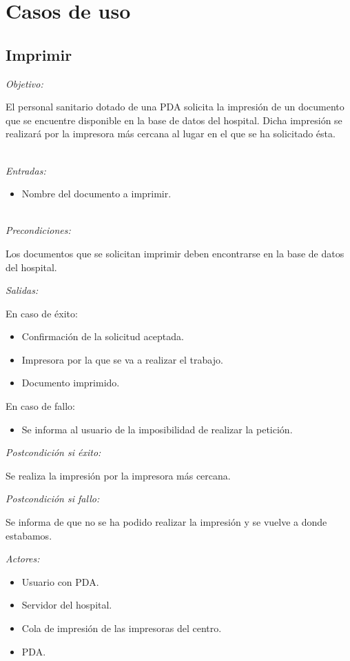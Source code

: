 \documentclass[12pt,a4paper,notitlepage,twoside]{report}
\begin{document}
\section{Casos de uso}
\subsection{Imprimir}
\emph{Objetivo:}
\begin{description}
El personal sanitario dotado de una PDA solicita la impresi\'on de un documento que se encuentre disponible en la base de datos del hospital. Dicha impresi\'on se realizará por la impresora m\'as cercana al lugar en el que se ha solicitado \'esta.
\end{description}
\\
\emph{Entradas:} 
\begin{itemize}
\item Nombre del documento a imprimir.
\end{itemize}
\\
\emph{Precondiciones:}
\begin{description}
Los documentos que se solicitan imprimir deben encontrarse en la base de datos del hospital.
\end{description}
\emph{Salidas:}
\begin{description}
\item En caso de \'exito: 
\begin{itemize}
\item Confirmaci\'on de la solicitud aceptada.
\item Impresora por la que se va a realizar el trabajo.
\item Documento imprimido.
\end{itemize}
\item En caso de fallo: 
\begin{itemize}
\item Se informa al usuario de la imposibilidad de realizar la petici\'on.
\end{itemize}
\end{description}
\emph{Postcondici\'on si \'exito:}
\begin{description}
Se realiza la impresi\'on por la impresora m\'as cercana.
\end{description}
\emph{Postcondici\'on si fallo:}
\begin{description}
Se informa de que no se ha podido realizar la impresi\'on y se vuelve a donde estabamos.
\end{description}
\emph{Actores: }
\begin{itemize}
\item Usuario con PDA.
\item Servidor del hospital.
\item Cola de impresi\'on de las impresoras del centro.
\item PDA.
\end{itemize}
\end{document}
